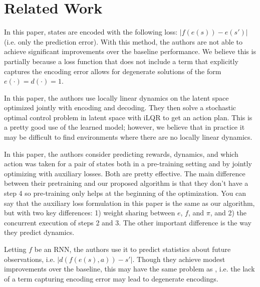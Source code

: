 \documentclass{report}
\begin{document}
\section*{Related Work}
\cite{munk2016learning} In this paper, states are encoded with the following loss: $|f(e(s)) - e(s')|$ (i.e. only the prediction error). With this method, the authors are not able to achieve significant improvements over the baseline performance. We believe this is partially because a loss function that does not include a term that explicitly captures the encoding error allows for degenerate solutions of the form $e(\cdot) = d(\cdot) = 1$. \newline %

\cite{watter2015embed} In this paper, the authors use locally linear dynamics on the latent space optimized jointly with encoding and decoding. They then solve a stochastic optimal control problem in latent space with iLQR to get an action plan. This is a pretty good use of the learned model; however, we believe that in practice it may be difficult to find environments where there are no locally linear dynamics. \newline %

\cite{shelhamer2016loss} In this paper, the authors consider predicting rewards, dynamics, and which action was taken for a pair of states both in a pre-training setting and by jointly optimizing with auxiliary losses. Both are pretty effective. The main difference between their pretraining and our proposed algorithm is that they don't have a step 4 so pre-training only helps at the beginning of the optimization. You can say that the auxiliary loss formulation in this paper is the same as our algorithm, but with two key differences: 1) weight sharing between $e$, $f$, and $\pi$, and 2) the concurrent execution of steps 2 and 3. The other important difference is the way they predict dynamics. \newline %

\cite{venkatraman2017predictive} Letting $f$ be an RNN, the authors use it to predict statistics about future observations, i.e. $|d(f(e(s), a)) - s'|$. Though they achieve modest improvements over the baseline, this may have the same problem as \cite{munk2016learning}, i.e. the lack of a term capturing encoding error may lead to degenerate encodings.



\end{document}
